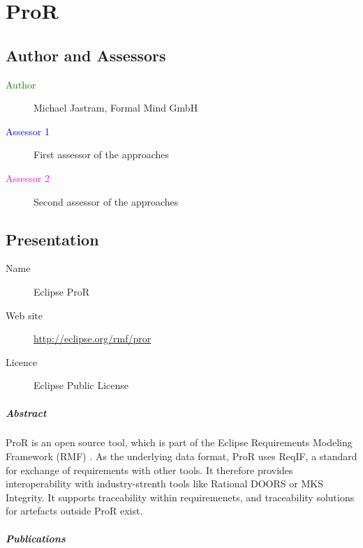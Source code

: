 \chapter{ProR}
\label{sec:pror}

\section{Author and Assessors}

\begin{description}
\item[\textcolor{green}{Author}] Michael Jastram, Formal Mind GmbH
\item[\textcolor{blue}{Assessor 1}] First assessor of the approaches 
\item[\textcolor{magenta}{Assessor 2}] Second assessor of the approaches 
\end{description}

\section{Presentation}

\begin{description}
\item[Name] Eclipse ProR
\item[Web site] \url{http://eclipse.org/rmf/pror}
\item[Licence] Eclipse Public License
\end{description}

\paragraph{Abstract}

ProR is an open source tool, which is part of the Eclipse Requirements Modeling Framework (RMF) \cite{RMF}.  As the underlying data format, ProR uses ReqIF, a standard for exchange of requirements with other tools.  It therefore provides interoperability with industry-strenth tools like Rational DOORS or MKS Integrity.  It supports traceability within requiremenets, and traceability solutions for artefacts outside ProR exist.

\paragraph{Publications}

